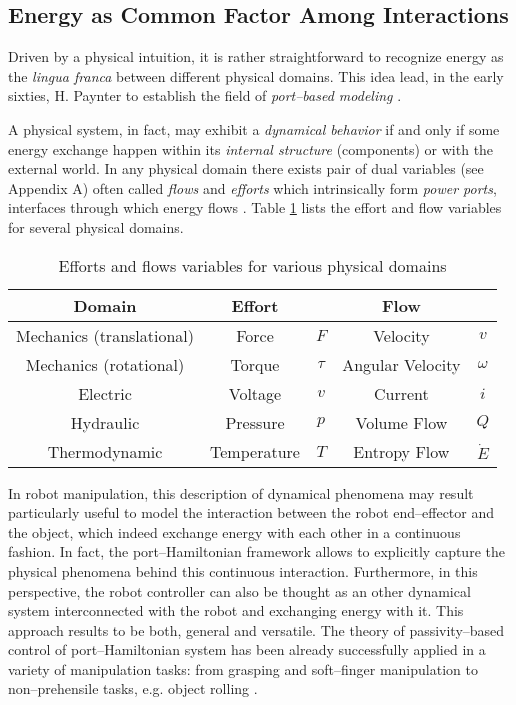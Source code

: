 \subsection{Energy as Common Factor Among Interactions}\label{subsec:comm_fact}
%
Driven by a physical intuition, it is rather straightforward to recognize energy as the \textit{lingua franca} between different physical domains. This idea lead, in the early sixties, H. Paynter to establish the field of \textit{port--based modeling} \cite{paynter1961analysis}.
%
\newline

%
A physical system, in fact, may exhibit a \textit{dynamical behavior} if and only if some energy exchange happen within its \textit{internal structure} (components) or with the external world. In any physical domain there exists pair of dual variables (see Appendix A) often called \textit{flows} and \textit{efforts} which intrinsically form \textit{power ports}, interfaces through which energy flows \cite{secchi2007control}. Table \ref{tab:ef} lists the effort and flow variables for several physical domains.
%
\begin{table}[t]
	\centering
	\begin{tabular}{|c|cc|cc|} \hline
			\rowcolor{gray!50}\textbf{Domain}&{\centering \textbf{Effort}}&&{\centering \textbf{Flow}}&\\\hline
			Mechanics (translational)&Force&$F$&Velocity&$v$\\\hline
			\rowcolor{gray!15}Mechanics (rotational)&Torque &$\tau$&Angular Velocity &$\omega$\\\hline
			Electric&Voltage &$v$&Current &$i$\\\hline
			\rowcolor{gray!15}Hydraulic&Pressure& $p$&Volume Flow &$Q$\\\hline
			Thermodynamic&Temperature &$T$&Entropy Flow &$\dot{E}$\\\hline
	\end{tabular}
	\caption{Efforts and flows variables for various physical domains}
	\label{tab:ef}
\end{table}
%
\newline

In robot manipulation, this description of dynamical phenomena may result particularly useful to model the interaction between the robot end--effector and the object, which indeed exchange energy with each other in a continuous fashion.
%
In fact, the port--Hamiltonian framework allows to explicitly capture the physical phenomena behind this continuous interaction. Furthermore, in this perspective, the robot controller can also be thought as an other dynamical system interconnected with the robot and exchanging energy with it. 
This approach results to be both, general and versatile.
%
The theory of passivity--based control of port--Hamiltonian system has been already successfully applied in a variety of manipulation tasks: from grasping \cite{stramigioli99} and soft--finger manipulation \cite{ficuciello2010} to non--prehensile tasks, e.g. object rolling \cite{donaire2017,serra2019}.
%
\newline

